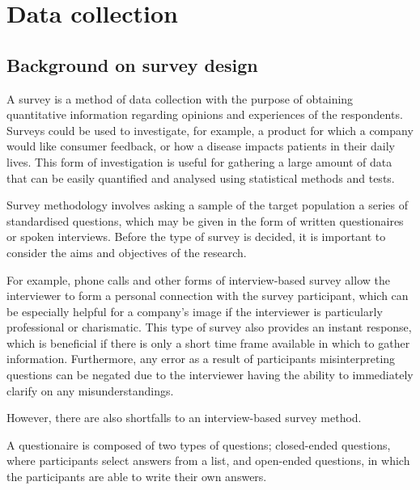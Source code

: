 \chapter{Data collection}

\section{Background on survey design}


A survey is a method of data collection with the purpose of obtaining quantitative information regarding opinions and 
experiences of the respondents. Surveys could be used to investigate, for example, a product for which a company would like 
consumer feedback, or how a disease impacts patients in their daily lives. This form of investigation is useful for gathering a
large amount of data that can be easily quantified and analysed using statistical methods and tests. 

Survey methodology involves asking a sample of the target population a series of standardised questions, which may be given in 
the form of written questionaires or spoken interviews. Before the type of survey is decided, it is important to consider the 
aims and objectives of the research. 

For example, phone calls and other forms of interview-based survey allow the interviewer to form a personal connection with 
the survey participant, which can be especially helpful for a company's image if the interviewer is particularly professional 
or charismatic. This type of survey also provides an instant response, which is beneficial if there is only a short time frame 
available in which to gather information. Furthermore, any error as a result of participants misinterpreting questions can be 
negated due to the interviewer having the ability to immediately clarify on any misunderstandings. 

However, there are also shortfalls to an interview-based survey method.




A questionaire is composed of two types of questions; closed-ended questions, where participants select answers from a list,
and open-ended questions, in which the participants are able to write their own answers. 



